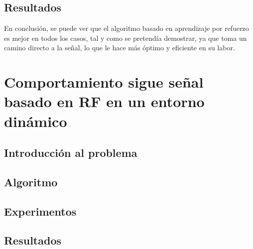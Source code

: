 \subsection{Resultados}
\label{subsec:resultados_sf}

En conclusión, se puede ver que el algoritmo basado en aprendizaje por refuerzo es mejor en todos los casos, tal y como se pretendía demostrar, ya que toma un camino directo a la señal, lo que le hace más óptimo y eficiente en su labor.\\

\section{Comportamiento sigue señal basado en \ac{RF} en un entorno dinámico}
\label{sec:signal_follow_obs}

\subsection{Introducción al problema}
\label{subsec:intro_sfo}

\subsection{Algoritmo}
\label{subsec:algoritmo_sfo}

\subsection{Experimentos}
\label{subsec:experimentos_sfo}

\subsection{Resultados}
\label{subsec:resultados_sfo}